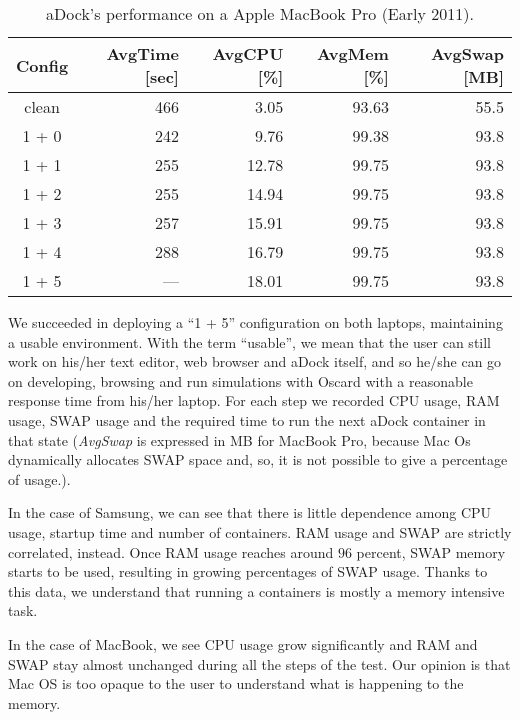 \begin{table}[h!]
\centering
  \begin{tabular}{| c | r | r | r | r |}
  \hline
  \textbf{Config} & \textbf{AvgTime [sec]} & \textbf{AvgCPU [\%]} & \textbf{AvgMem [\%]} & \textbf{AvgSwap [MB]}  \\
  \hline
  clean & 466 & 3.05 & 93.63 & 55.5 \\
  \hline
  1 + 0 & 242 & 9.76 & 99.38 & 93.8 \\
  \hline
  1 + 1 & 255 & 12.78 & 99.75 & 93.8 \\
  \hline
  1 + 2 & 255 & 14.94 & 99.75 & 93.8 \\
  \hline
  1 + 3 & 257 & 15.91 & 99.75 & 93.8 \\
  \hline
  1 + 4 & 288 & 16.79 & 99.75 & 93.8 \\
  \hline
  1 + 5 & --- & 18.01 & 99.75 & 93.8 \\
  \hline
  \end{tabular}
  \vspace{2mm}
  \caption{aDock's performance on a Apple MacBook Pro (Early 2011).}
  \label{tab:adock_macpro}
\end{table}

We succeeded in deploying a ``1 + 5'' configuration on both laptops, maintaining a usable environment. With the term ``usable'', we mean that the user can still work on his/her text editor, web browser and aDock itself, and so he/she can go on developing, browsing and run simulations with Oscard with a reasonable response time from his/her laptop. For each step we recorded CPU usage, RAM usage, SWAP usage and the required time to run the next aDock container in that state (\textit{AvgSwap} is expressed in MB for MacBook Pro, because Mac Os dynamically allocates SWAP space and, so, it is not possible to give a percentage of usage.).

In the case of Samsung, we can see that there is little dependence among CPU usage, startup time and number of containers. RAM usage and SWAP are strictly correlated, instead. Once RAM usage reaches around $96$ percent, SWAP memory starts to be used, resulting in growing percentages of SWAP usage. Thanks to this data, we understand that running a containers is mostly a memory intensive task.

In the case of MacBook, we see CPU usage grow significantly and RAM and SWAP stay almost unchanged during all the steps of the test. Our opinion is that Mac OS is too opaque to the user to understand what is happening to the memory.

